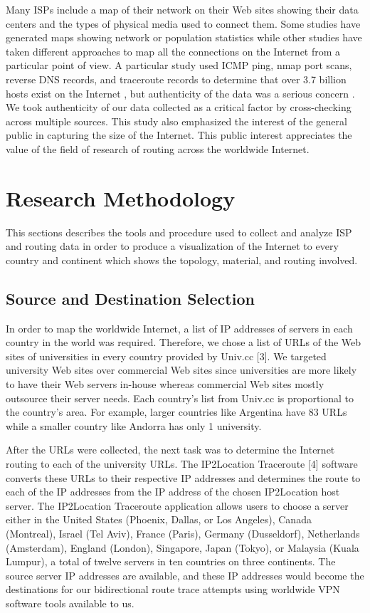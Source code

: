 \documentclass{sigcomm-alternate}
\begin{document}
Many ISPs include a map of their network on their Web sites showing their data centers and the types of physical media used to connect them. Some studies have generated maps showing network or population statistics while other studies have taken different approaches to map all the connections on the Internet from a particular point of view. A particular study used ICMP ping, nmap port scans, reverse DNS records, and traceroute records to determine that over 3.7 billion hosts exist on the Internet , but authenticity of the data was a serious concern \cite{botnet}. We took authenticity of our data collected as a critical factor by cross-checking across multiple sources. This study also emphasized the interest of the general public in capturing the size of the Internet. This public interest appreciates the value of the field of research of routing across the worldwide Internet.

\section{Research Methodology}

This sections describes the tools and procedure used to collect and analyze ISP and routing data in order to produce a visualization of the Internet to every country and continent which shows the topology, material, and routing involved.

\subsection{Source and Destination Selection}
In order to map the worldwide Internet, a list of IP addresses of servers in each country in the world was required. Therefore, we chose a list of URLs of the Web sites of universities in every country provided by Univ.cc [3]. We targeted university Web sites over commercial Web sites since universities are more likely to have their Web servers in-house whereas commercial Web sites mostly outsource their server needs. Each country’s list from Univ.cc is proportional to the country’s area. For example, larger countries like Argentina have 83 URLs while a smaller country like Andorra has only 1 university.  

After the URLs were collected, the next task was to determine the Internet routing to each of the university URLs. The IP2Location Traceroute [4] software converts these URLs to their respective IP addresses and determines the route to each of the IP addresses from the IP address of the chosen IP2Location host server. The IP2Location Traceroute application allows users to choose a server either in the United States (Phoenix, Dallas, or Los Angeles), Canada (Montreal), Israel (Tel Aviv), France (Paris), Germany (Dusseldorf), Netherlands (Amsterdam), England (London), Singapore, Japan (Tokyo), or Malaysia (Kuala Lumpur), a total of twelve servers in ten countries on three continents. The source server IP addresses are available, and these IP addresses would become the destinations for our bidirectional route trace attempts using worldwide VPN software tools available to us.
\end{document}
